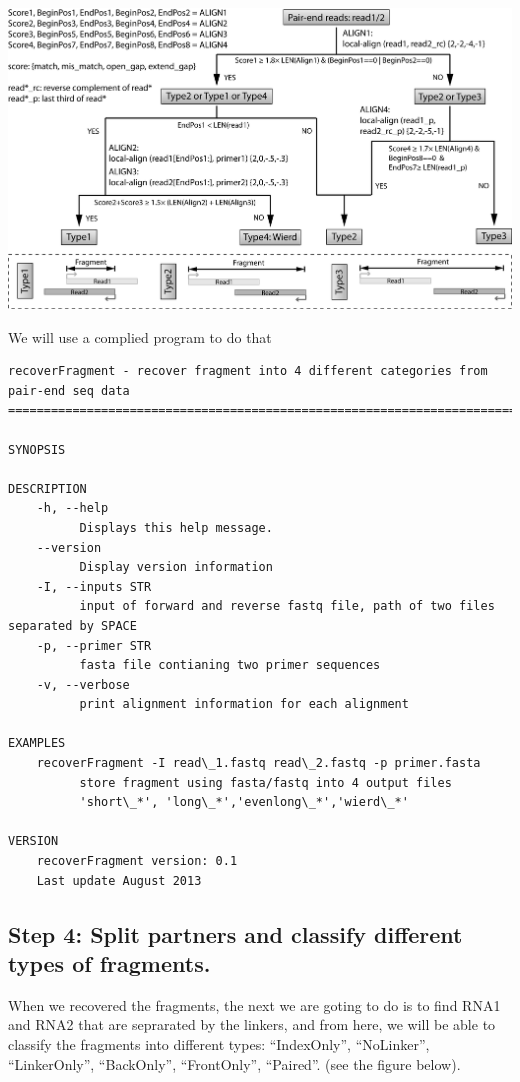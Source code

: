 \documentclass[letterpaper,10pt,english]{sphinxmanual}
\begin{document}
{\hfill\includegraphics{workflow_for_recoverFragment.jpg}\hfill}

We will use a complied program  to do that

\begin{Verbatim}[commandchars=\\\{\}]
recoverFragment - recover fragment into 4 different categories from pair-end seq data
=====================================================================================

SYNOPSIS

DESCRIPTION
    -h, --help
          Displays this help message.
    --version
          Display version information
    -I, --inputs STR
          input of forward and reverse fastq file, path of two files separated by SPACE
    -p, --primer STR
          fasta file contianing two primer sequences
    -v, --verbose
          print alignment information for each alignment

EXAMPLES
    recoverFragment -I read\_1.fastq read\_2.fastq -p primer.fasta
          store fragment using fasta/fastq into 4 output files
          'short\_*', 'long\_*','evenlong\_*','wierd\_*'

VERSION
    recoverFragment version: 0.1
    Last update August 2013
\end{Verbatim}


\subsection{Step 4: Split partners and classify different types of fragments.}
\label{Analysis_pipeline:step4}\label{Analysis_pipeline:step-4-split-partners-and-classify-different-types-of-fragments}
When we recovered the fragments, the next we are goting to do is to find RNA1 and RNA2 that are seprarated by the linkers, and from here, we will be able to classify the fragments into different types: ``IndexOnly'', ``NoLinker'', ``LinkerOnly'', ``BackOnly'', ``FrontOnly'', ``Paired''. (see the figure below).
\end{document}
